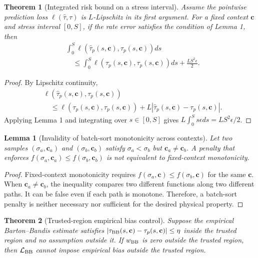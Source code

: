 \documentclass[journal]{IEEEtran}
\newtheorem{theorem}{Theorem}
\newtheorem{lemma}{Lemma}
\begin{document}
\begin{theorem}[Integrated risk bound on a stress interval]
Assume the pointwise prediction loss $\ell(\widehat\tau,\tau)$ is $L$-Lipschitz in its first argument. For a fixed context $\mathbf{c}$ and stress interval $[0,S]$, if the rate error satisfies the condition of Lemma 1, then
\begin{align}
&\int_0^S \ell(\widehat{\tau}_p(s,\mathbf{c}),\tau_p(s,\mathbf{c}))ds \nonumber\\
&\quad \le \int_0^S \ell(\tau_p(s,\mathbf{c}),\tau_p(s,\mathbf{c}))ds
      +\frac{LS^2\epsilon}{2}.
\end{align}
\end{theorem}

\begin{proof}
By Lipschitz continuity,
\begin{align}
&\ell(\widehat{\tau}_p(s,\mathbf{c}),\tau_p(s,\mathbf{c})) \nonumber\\
&\quad \le \ell(\tau_p(s,\mathbf{c}),\tau_p(s,\mathbf{c}))
      +L|\widehat{\tau}_p(s,\mathbf{c})-\tau_p(s,\mathbf{c})|.
\end{align}
Applying Lemma 1 and integrating over $s\in[0,S]$ gives $L\int_0^S s\epsilon ds=LS^2\epsilon/2$.
\end{proof}

\begin{lemma}[Invalidity of batch-sort monotonicity across contexts]
Let two samples $(\sigma_a,\mathbf{c}_a)$ and $(\sigma_b,\mathbf{c}_b)$ satisfy $\sigma_a<\sigma_b$ but $\mathbf{c}_a\ne\mathbf{c}_b$. A penalty that enforces $f(\sigma_a,\mathbf{c}_a)\le f(\sigma_b,\mathbf{c}_b)$ is not equivalent to fixed-context monotonicity.
\end{lemma}

\begin{proof}
Fixed-context monotonicity requires $f(\sigma_a,\mathbf{c})\le f(\sigma_b,\mathbf{c})$ for the same $\mathbf{c}$. When $\mathbf{c}_a\ne\mathbf{c}_b$, the inequality compares two different functions along two different paths. It can be false even if each path is monotone. Therefore, a batch-sort penalty is neither necessary nor sufficient for the desired physical property.
\end{proof}

\begin{theorem}[Trusted-region empirical bias control]
Suppose the empirical Barton--Bandis estimate satisfies $|\tau_{\rm BB}(s,\mathbf{c})-\tau_p(s,\mathbf{c})|\le\eta$ inside the trusted region and no assumption outside it. If $w_{\rm BB}$ is zero outside the trusted region, then $\mathcal{L}_{\rm BB}$ cannot impose empirical bias outside the trusted region.
\end{theorem}
\end{document}
